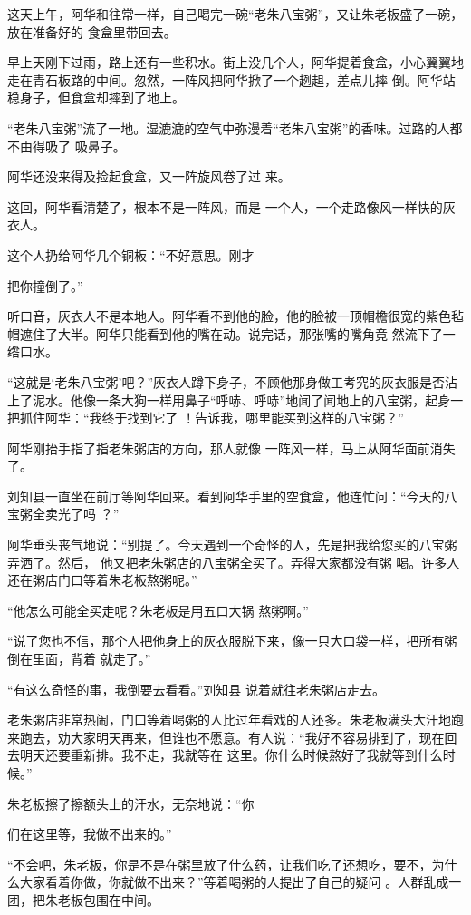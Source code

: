 \documentclass{article}
\begin{document}
\newpage

这天上午，阿华和往常一样，自己喝完一碗“老朱八宝粥”，又让朱老板盛了一碗，放在准备好的
食盒里带回去。 

早上天刚下过雨，路上还有一些积水。街上没几个人，阿华提着食盒，小心翼翼地走在青石板路的中间。忽然，一阵风把阿华掀了一个趔趄，差点儿摔
倒。阿华站稳身子，但食盒却摔到了地上。 

“老朱八宝粥”流了一地。湿漉漉的空气中弥漫着“老朱八宝粥”的香味。过路的人都不由得吸了
吸鼻子。 

阿华还没来得及捡起食盒，又一阵旋风卷了过
来。 

这回，阿华看清楚了，根本不是一阵风，而是
一个人，一个走路像风一样快的灰衣人。 

这个人扔给阿华几个铜板：“不好意思。刚才

\newpage
把你撞倒了。” 

听口音，灰衣人不是本地人。阿华看不到他的脸，他的脸被一顶帽檐很宽的紫色毡帽遮住了大半。阿华只能看到他的嘴在动。说完话，那张嘴的嘴角竟
然流下了一绺口水。 

“这就是‘老朱八宝粥’吧？”灰衣人蹲下身子，不顾他那身做工考究的灰衣服是否沾上了泥水。他像一条大狗一样用鼻子“呼哧、呼哧”地闻了闻地上的八宝粥，起身一把抓住阿华：“我终于找到它了
！告诉我，哪里能买到这样的八宝粥？” 

阿华刚抬手指了指老朱粥店的方向，那人就像
一阵风一样，马上从阿华面前消失了。 

刘知县一直坐在前厅等阿华回来。看到阿华手里的空食盒，他连忙问：“今天的八宝粥全卖光了吗
？” 

阿华垂头丧气地说：“别提了。今天遇到一个奇怪的人，先是把我给您买的八宝粥弄洒了。然后，
\newpage
他又把老朱粥店的八宝粥全买了。弄得大家都没有粥
喝。许多人还在粥店门口等着朱老板熬粥呢。” 

“他怎么可能全买走呢？朱老板是用五口大锅
熬粥啊。” 

“说了您也不信，那个人把他身上的灰衣服脱下来，像一只大口袋一样，把所有粥倒在里面，背着
就走了。” 

“有这么奇怪的事，我倒要去看看。”刘知县
说着就往老朱粥店走去。 

老朱粥店非常热闹，门口等着喝粥的人比过年看戏的人还多。朱老板满头大汗地跑来跑去，劝大家明天再来，但谁也不愿意。有人说：“我好不容易排到了，现在回去明天还要重新排。我不走，我就等在
这里。你什么时候熬好了我就等到什么时候。” 

朱老板擦了擦额头上的汗水，无奈地说：“你

\newpage
们在这里等，我做不出来的。” 

“不会吧，朱老板，你是不是在粥里放了什么药，让我们吃了还想吃，要不，为什么大家看着你做，你就做不出来？”等着喝粥的人提出了自己的疑问
。人群乱成一团，把朱老板包围在中间。 
\end{document}
